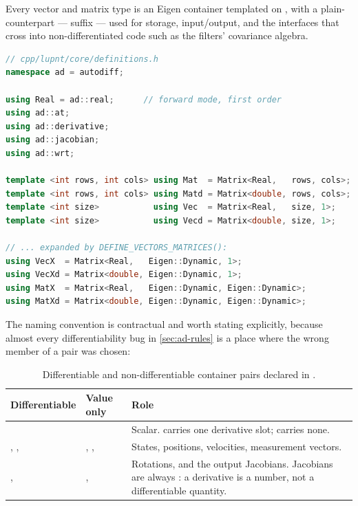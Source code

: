 Every \lupnt{} vector and matrix type is an Eigen container templated on
 \citep{eigen2010}, with a plain- counterpart --- suffix
 --- used for storage, input/output, and the interfaces that cross
into non-differentiated code such as the filters' covariance algebra.

\begin{lstlisting}[language=cpp, caption={Differentiable scalar, AD entry points, and container aliases. Source: \code{cpp/lupnt/core/definitions.h}}, label={lst:ad-defs}]
// cpp/lupnt/core/definitions.h
namespace ad = autodiff;

using Real = ad::real;      // forward mode, first order
using ad::at;
using ad::derivative;
using ad::jacobian;
using ad::wrt;

template <int rows, int cols> using Mat  = Matrix<Real,   rows, cols>;
template <int rows, int cols> using Matd = Matrix<double, rows, cols>;
template <int size>           using Vec  = Matrix<Real,   size, 1>;
template <int size>           using Vecd = Matrix<double, size, 1>;

// ... expanded by DEFINE_VECTORS_MATRICES():
using VecX  = Matrix<Real,   Eigen::Dynamic, 1>;
using VecXd = Matrix<double, Eigen::Dynamic, 1>;
using MatX  = Matrix<Real,   Eigen::Dynamic, Eigen::Dynamic>;
using MatXd = Matrix<double, Eigen::Dynamic, Eigen::Dynamic>;
\end{lstlisting}

The naming convention is contractual and worth stating explicitly, because
almost every differentiability bug in \cref{sec:ad-rules} is a place where the
wrong member of a pair was chosen:

\begin{table}[H]
  \centering
  \caption{Differentiable and non-differentiable container pairs declared in
    .}
  \label{tab:ad-types}
  \begin{tabularx}{\textwidth}{llL}
    \toprule
    Differentiable & Value only & Role \\
    \midrule
     &  & Scalar.  carries one derivative
      slot;  carries none. \\
    , ,  & , ,
       & States, positions, velocities, measurement vectors. \\
    ,  & ,  & Rotations, and the
      output Jacobians. Jacobians are always : a derivative is a
      number, not a differentiable quantity. \\
    \bottomrule
  \end{tabularx}
\end{table}

